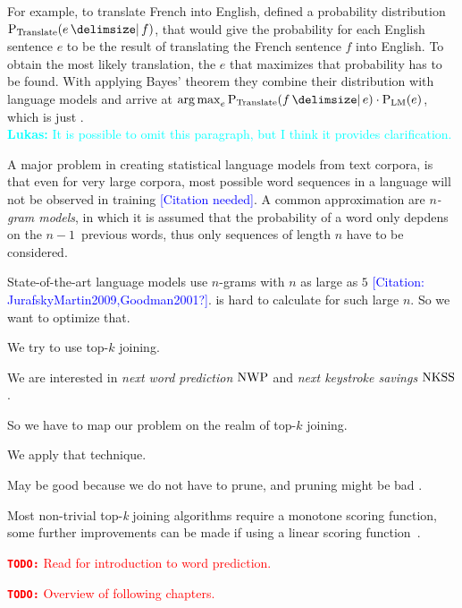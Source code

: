 \documentclass[m,bachelor,binding,palatino]{WeSTthesis}
\renewcommand\cref{\Cref}
\DeclareMathOperator*{\Argmax}{arg\,max}
\newenvironment{draft}{\color{draftcolor}}{}
\newcommand{\todo}[1]{\textcolor{red}{{\footnotesize\textbf{\texttt{TODO:}}} #1}}
\newcommand{\lukas}[1]{\textcolor{cyan}{{\footnotesize\textbf{Lukas:}} #1}}
\newcommand{\noref}{\textcolor{blue}{\footnotesize[Citation needed]}}
\newcommand{\mbref}[1]{\textcolor{blue}{\footnotesize[Citation: #1?]}}
\begin{document}
For example, to translate French into English, \cite{Brown1990} defined a
probability distribution $\Prob[\text{Translate}]{e}{f}$, that would give the
probability for each English sentence $e$ to be the result of translating
the French sentence $f$ into English.
To obtain the most likely translation, the $e$ that maximizes that probability
has to be found.
With applying Bayes' theorem they combine their distribution with language
models and arrive at
$\Argmax_{e} \Prob[\text{Translate}]{f}{e} \cdot \Prob[\text{LM}]{e}$, which is
just \cref{eq:noisychannelbayes}.
\\ \lukas{It is possible to omit this paragraph, but I think it provides
clarification.}

A major problem in creating statistical language models from text corpora, is
that even for very large corpora, most possible word sequences in a language
will not be observed in training \noref.
A common approximation are \emph{$n$-gram models}, in which it is assumed that
the probability of a word only depdens on the $n\!-\!1$~previous words, thus
only sequences of length $n$ have to be considered.

State-of-the-art language models use $n$-grams with $n$ as large as $5$
\mbref{JurafskyMartin2009,Goodman2001}.
\begin{draft}
 is hard to calculate for such large $n$.
So we want to optimize that.
\end{draft}

\begin{draft}
We try to use top-$k$ joining.

We are interested in \emph{next word prediction} $\NWP$ and
\emph{next keystroke savings} $\NKSS$.

So we have to map our problem on the realm of top-$k$ joining.

We apply that technique.

May be good because we do not have to prune, and pruning might be bad
\parencite{Stolcke2000,Chelba2013,Chelba2010,Siivola2007}.

Most non-trivial top-\emph{k} joining algorithms require a monotone scoring
function, some further improvements can be made if using a linear scoring
function~\parencite{Ilyas2008}.
\end{draft}

\todo{Read \cite{Bickel2005} for introduction to word prediction.}

\todo{Overview of following chapters.}
\end{document}
